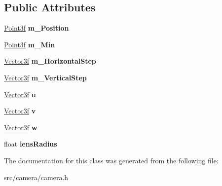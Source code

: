 \subsection*{Public Attributes}
\begin{DoxyCompactItemize}
\item 
\mbox{\label{class_camera_a9d7a75df953fdfc0a2fe64e1dddc3119}} 
\mbox{\hyperlink{class_point}{Point3f}} {\bfseries m\+\_\+\+Position}
\item 
\mbox{\label{class_camera_a41077a214d09203cf68eadd483e6dd90}} 
\mbox{\hyperlink{class_point}{Point3f}} {\bfseries m\+\_\+\+Min}
\item 
\mbox{\label{class_camera_a2d0f1b582bc24a9937a80ba58e7465e3}} 
\mbox{\hyperlink{class_vector3}{Vector3f}} {\bfseries m\+\_\+\+Horizontal\+Step}
\item 
\mbox{\label{class_camera_a37c3726aea8353af769f40bc1a867fcc}} 
\mbox{\hyperlink{class_vector3}{Vector3f}} {\bfseries m\+\_\+\+Vertical\+Step}
\item 
\mbox{\label{class_camera_a48a5dc4ca4efce717d6c42a638defbf7}} 
\mbox{\hyperlink{class_vector3}{Vector3f}} {\bfseries u}
\item 
\mbox{\label{class_camera_a83c9a9992d47918634851eb8d57d2741}} 
\mbox{\hyperlink{class_vector3}{Vector3f}} {\bfseries v}
\item 
\mbox{\label{class_camera_a8a282fcda47664db56c8d59213b3099e}} 
\mbox{\hyperlink{class_vector3}{Vector3f}} {\bfseries w}
\item 
\mbox{\label{class_camera_a9c1a8b9fe0fe3f2d5ad5f4e42d186ec2}} 
float {\bfseries lens\+Radius}
\end{DoxyCompactItemize}


The documentation for this class was generated from the following file\+:\begin{DoxyCompactItemize}
\item 
src/camera/camera.\+h\end{DoxyCompactItemize}
